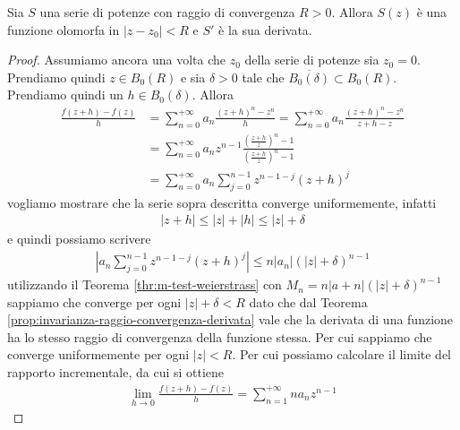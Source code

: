 \begin{theorem}
	\label{thr:teorema-di-abel}
	Sia $S$ una serie di potenze con raggio di convergenza $R > 0$. Allora $S(z)$ è una funzione olomorfa in $|z-z_0| < R$ e $S'$ è la sua derivata.
\end{theorem}
\begin{proof}
	Assumiamo ancora una volta che $z_0$ della serie di potenze sia $z_0 = 0$. Prendiamo quindi $z \in B_0(R)$ e sia $\delta > 0$ tale che $\overline{B_0(\delta)} \subset B_0(R)$. Prendiamo quindi un $h \in B_0(\delta)$. Allora
	\begin{equation}
	\begin{aligned}
		\frac{f(z+h) - f(z)}{h} & = \sum^{+\infty}_{n=0} a_n \frac{(z+h)^n - z^n}{h} = \sum^{+\infty}_{n=0} a_n \frac{(z+h)^n-z^n}{z+h-z} \\
								& = \sum^{+\infty}_{n=0} a_n z^{n-1} \frac{\left(\frac{z+h}{z}\right)^n - 1}{\left(\frac{z+h}{z}\right)^n - 1} \\
								& = \sum^{+\infty}_{n=0} a_n \sum^{n-1}_{j=0} z^{n-1-j}(z+h)^j 
	\end{aligned}
	\end{equation}
	vogliamo mostrare che la serie sopra descritta converge uniformemente, infatti
	\begin{equation}
	\begin{aligned}
		|z+h| \le |z| + |h| \le |z| + \delta
	\end{aligned}
	\end{equation}
	e quindi possiamo scrivere 
	\begin{equation}
	\begin{aligned}
		\left|a_n \sum^{n-1}_{j=0} z^{n-1-j}(z+h)^j \right| \le n|a_n|(|z|+\delta)^{n-1} 
	\end{aligned}
	\end{equation}
	utilizzando il Teorema \ref{thr:m-test-weierstrass} con $M_n = n|a+n|(|z|+\delta)^{n-1}$ sappiamo che converge per ogni $|z|+\delta < R$ dato che dal Teorema \ref{prop:invarianza-raggio-convergenza-derivata} vale che la derivata di una funzione ha lo stesso raggio di convergenza della funzione stessa. Per cui sappiamo che converge uniformemente per ogni $|z| < R$. 
	Per cui possiamo calcolare il limite del rapporto incrementale, da cui si ottiene 
	\begin{equation}
	\begin{aligned}
		\lim_{h\to 0} \frac{f(z+h) - f(z)}{h} = \sum^{+\infty}_{n=1} na_nz^{n-1}
	\end{aligned}
	\end{equation}
\end{proof}

